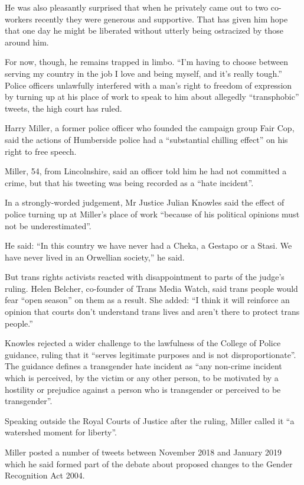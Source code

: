 He was also pleasantly surprised that when he privately came out to two co-workers recently they were generous and supportive. That has given him hope that one day he might be liberated without utterly being ostracized by those around him.

For now, though, he remains trapped in limbo. “I’m having to choose between serving my country in the job I love and being myself, and it’s really tough.”
Police officers unlawfully interfered with a man’s right to freedom of expression by turning up at his place of work to speak to him about allegedly “transphobic” tweets, the high court has ruled.

Harry Miller, a former police officer who founded the campaign group Fair Cop, said the actions of Humberside police had a “substantial chilling effect” on his right to free speech.

Miller, 54, from Lincolnshire, said an officer told him he had not committed a crime, but that his tweeting was being recorded as a “hate incident”.

In a strongly-worded judgement, Mr Justice Julian Knowles said the effect of police turning up at Miller’s place of work “because of his political opinions must not be underestimated”.

He said: “In this country we have never had a Cheka, a Gestapo or a Stasi. We have never lived in an Orwellian society,” he said.

But trans rights activists reacted with disappointment to parts of the judge’s ruling. Helen Belcher, co-founder of Trans Media Watch, said trans people would fear “open season” on them as a result. She added: “I think it will reinforce an opinion that courts don’t understand trans lives and aren’t there to protect trans people.”

Knowles rejected a wider challenge to the lawfulness of the College of Police guidance, ruling that it “serves legitimate purposes and is not disproportionate”. The guidance defines a transgender hate incident as “any non-crime incident which is perceived, by the victim or any other person, to be motivated by a hostility or prejudice against a person who is transgender or perceived to be transgender”.

Speaking outside the Royal Courts of Justice after the ruling, Miller called it “a watershed moment for liberty”.

Miller posted a number of tweets between November 2018 and January 2019 which he said formed part of the debate about proposed changes to the Gender Recognition Act 2004.

